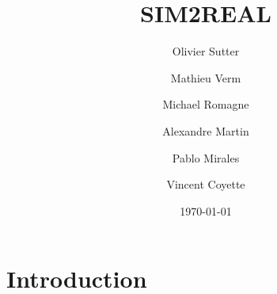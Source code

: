 \documentclass[12pt]{article}
\title{SIM2REAL}
\author{Olivier Sutter \and Mathieu Verm \and Michael Romagne \and Alexandre Martin \and Pablo Mirales \and Vincent Coyette}
\date{\today}
\begin{document}
\maketitle{}

\tableofcontents

\clearpage
\newpage

\section{Introduction}
\end{document}
